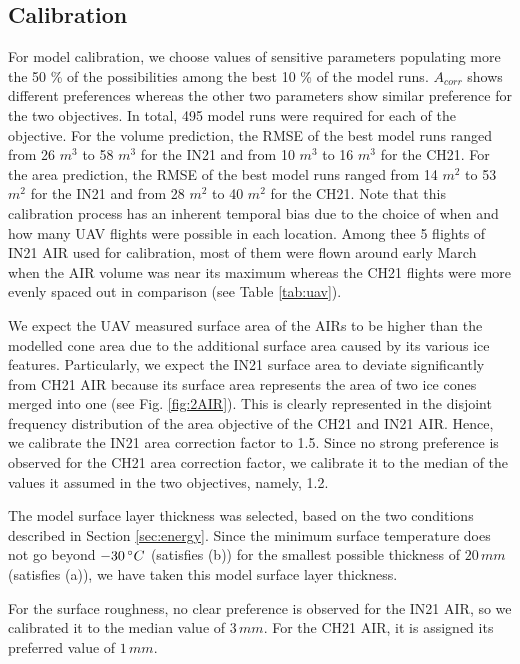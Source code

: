 \documentclass[utf8]{frontiersSCNS} %
\begin{document}
\subsection{Calibration}

For model calibration, we choose values of sensitive parameters populating more the 50 \% of the possibilities
among the best 10 \% of the model runs. $A_{corr}$ shows different preferences whereas the other two parameters
show similar preference for the two objectives. In total, 495 model runs were required for each of the objective.
For the volume prediction, the RMSE of the best model runs ranged from 26 $m^3$ to 58 $m^3$ for the IN21 and from
10 $m^3$ to 16 $m^3$ for the CH21. For the area prediction, the RMSE of the best model runs ranged from 14 $m^2$ to
53 $m^2$ for the IN21 and from 28 $m^2$ to 40 $m^2$ for the CH21. Note that this calibration process has an
inherent temporal bias due to the choice of when and how many UAV flights were possible in each location. Among
thee 5 flights of IN21 AIR used for calibration, most of them were flown around early March when the AIR volume was
near its maximum whereas the CH21 flights were more evenly spaced out in comparison (see Table \ref{tab:uav}).

We expect the UAV measured surface area of the AIRs to be higher than the modelled cone area due to the additional
surface area caused by its various ice features. Particularly, we expect the IN21 surface area to deviate
significantly from CH21 AIR because its surface area represents the area of two ice cones merged into one (see Fig.
\ref{fig:2AIR}). This is clearly represented in the disjoint frequency distribution of the area objective of the
CH21 and IN21 AIR. Hence, we calibrate the IN21 area correction factor to 1.5. Since no strong preference is
observed for the CH21 area correction factor, we calibrate it to the median of the values it assumed in the two
objectives, namely, 1.2.

The model surface layer thickness was selected, based on the two conditions described in Section \ref{sec:energy}.
Since the minimum surface temperature does not go beyond $-30 \, \degree C$ (satisfies (b)) for the smallest
possible thickness of $20\, mm$ (satisfies (a)), we have taken this model surface layer thickness.

For the surface roughness, no clear preference is observed for the IN21 AIR, so we calibrated it to the median
value of $3 \, mm$. For the CH21 AIR, it is assigned its preferred value of $1 \, mm$.
\end{document}
